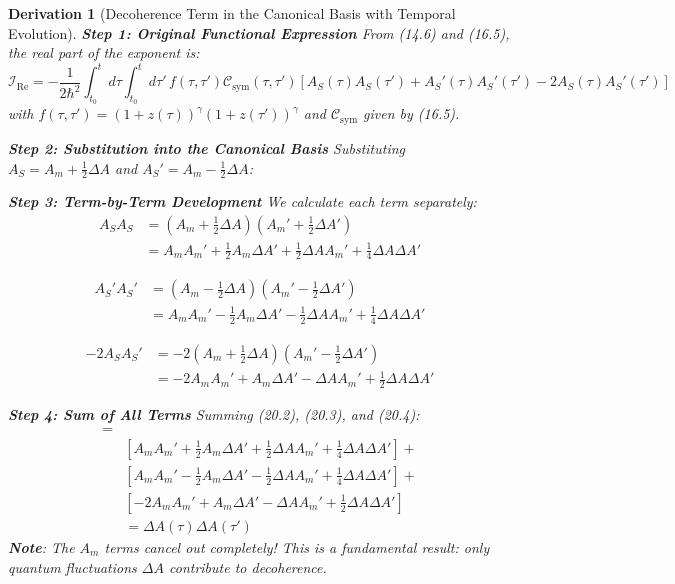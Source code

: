 \documentclass[10pt, a4paper]{article}
\newtheorem{derivation}{Derivation}
\begin{document}
\begin{derivation}[Decoherence Term in the Canonical Basis with Temporal Evolution]
\textbf{Step 1: Original Functional Expression}
From (14.6) and (16.5), the real part of the exponent is:
\begin{equation}
\mathcal{I}_{\text{Re}} = -\frac{1}{2\hbar^2} \int_{t_0}^{t} d\tau \int_{t_0}^{t} d\tau' \, f(\tau,\tau') \mathcal{C}_{\text{sym}}(\tau,\tau') \left[ A_S(\tau)A_S(\tau') + A_S'(\tau)A_S'(\tau') - 2A_S(\tau)A_S'(\tau') \right]
\tag{20.1}
\end{equation}
with $f(\tau,\tau') = (1+z(\tau))^\gamma (1+z(\tau'))^\gamma$ and $\mathcal{C}_{\text{sym}}$ given by (16.5).

\textbf{Step 2: Substitution into the Canonical Basis}
Substituting $A_S = A_m + \frac{1}{2}\Delta A$ and $A_S' = A_m - \frac{1}{2}\Delta A$:

\textbf{Step 3: Term-by-Term Development}
We calculate each term separately:
\begin{align}
A_SA_S &= \left(A_m + \frac{1}{2}\Delta A\right)\left(A_m' + \frac{1}{2}\Delta A'\right) \\
&= A_mA_m' + \frac{1}{2}A_m\Delta A' + \frac{1}{2}\Delta A A_m' + \frac{1}{4}\Delta A\Delta A'
\tag{20.2}
\end{align}

\begin{align}
A_S'A_S' &= \left(A_m - \frac{1}{2}\Delta A\right)\left(A_m' - \frac{1}{2}\Delta A'\right) \\
&= A_mA_m' - \frac{1}{2}A_m\Delta A' - \frac{1}{2}\Delta A A_m' + \frac{1}{4}\Delta A\Delta A'
\tag{20.3}
\end{align}

\begin{align}
-2A_SA_S' &= -2\left(A_m + \frac{1}{2}\Delta A\right)\left(A_m' - \frac{1}{2}\Delta A'\right) \\
&= -2A_mA_m' + A_m\Delta A' - \Delta A A_m' + \frac{1}{2}\Delta A\Delta A'
\tag{20.4}
\end{align}

\textbf{Step 4: Sum of All Terms}
Summing (20.2), (20.3), and (20.4):
\begin{align}
[A_SA_S &+ A_S'A_S' - 2A_SA_S'] = \\
&\left[A_mA_m' + \frac{1}{2}A_m\Delta A' + \frac{1}{2}\Delta A A_m' + \frac{1}{4}\Delta A\Delta A'\right] + \\
&\left[A_mA_m' - \frac{1}{2}A_m\Delta A' - \frac{1}{2}\Delta A A_m' + \frac{1}{4}\Delta A\Delta A'\right] + \\
&\left[-2A_mA_m' + A_m\Delta A' - \Delta A A_m' + \frac{1}{2}\Delta A\Delta A'\right] \\
&= \Delta A(\tau)\Delta A(\tau')
\tag{20.5}
\end{align}
\textbf{Note}: The $A_m$ terms cancel out completely! This is a fundamental result: only quantum fluctuations $\Delta A$ contribute to decoherence.


\end{derivation}
\end{document}
